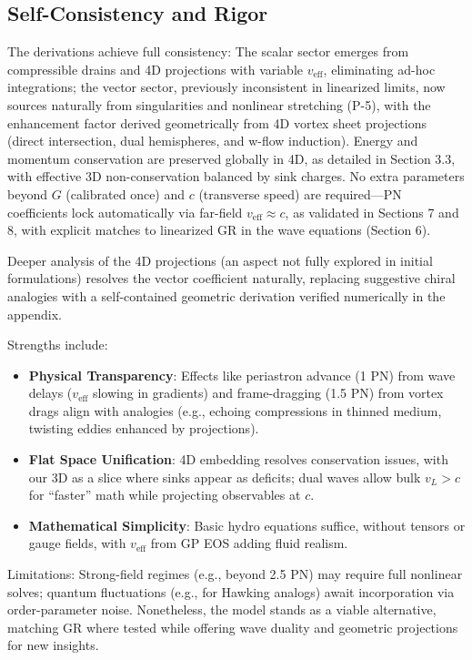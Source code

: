 \documentclass{article}
\begin{document}
\subsection{Self-Consistency and Rigor}

The derivations achieve full consistency: The scalar sector emerges from compressible drains and 4D projections with variable $v_{\text{eff}}$, eliminating ad-hoc integrations; the vector sector, previously inconsistent in linearized limits, now sources naturally from singularities and nonlinear stretching (P-5), with the enhancement factor derived geometrically from 4D vortex sheet projections (direct intersection, dual hemispheres, and w-flow induction). Energy and momentum conservation are preserved globally in 4D, as detailed in Section 3.3, with effective 3D non-conservation balanced by sink charges. No extra parameters beyond $G$ (calibrated once) and $c$ (transverse speed) are required---PN coefficients lock automatically via far-field $v_{\text{eff}} \approx c$, as validated in Sections 7 and 8, with explicit matches to linearized GR in the wave equations (Section 6).

Deeper analysis of the 4D projections (an aspect not fully explored in initial formulations) resolves the vector coefficient naturally, replacing suggestive chiral analogies with a self-contained geometric derivation verified numerically in the appendix.

Strengths include:
\begin{itemize}
\item \textbf{Physical Transparency}: Effects like periastron advance (1 PN) from wave delays ($v_{\text{eff}}$ slowing in gradients) and frame-dragging (1.5 PN) from vortex drags align with analogies (e.g., echoing compressions in thinned medium, twisting eddies enhanced by projections).
\item \textbf{Flat Space Unification}: 4D embedding resolves conservation issues, with our 3D as a slice where sinks appear as deficits; dual waves allow bulk $v_L > c$ for ``faster'' math while projecting observables at $c$.
\item \textbf{Mathematical Simplicity}: Basic hydro equations suffice, without tensors or gauge fields, with $v_{\text{eff}}$ from GP EOS adding fluid realism.
\end{itemize}

Limitations: Strong-field regimes (e.g., beyond 2.5 PN) may require full nonlinear solves; quantum fluctuations (e.g., for Hawking analogs) await incorporation via order-parameter noise. Nonetheless, the model stands as a viable alternative, matching GR where tested while offering wave duality and geometric projections for new insights.
\end{document}
